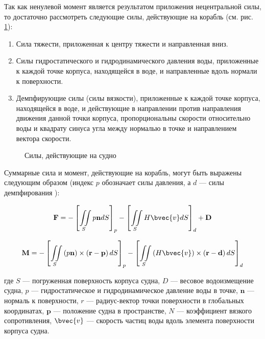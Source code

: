 Так как ненулевой момент является результатом приложения нецентральной силы, то достаточно рассмотреть следующие силы, действующие на корабль (см. рис. \ref{boat_forces}):
\begin{enumerate}
	\item	Сила тяжести, приложенная к центру тяжести и 
			направленная вниз.
	\item	Силы гидростатического и гидродинамического давления воды, приложенные к каждой точке корпуса, 
			находящейся в воде, и направленные вдоль нормали к поверхности.
	\item	Демпфирующие силы (силы вязкости), приложенные к каждой точке корпуса, 
			находящейся в воде, и действующие в направлении против 
			направления движения  данной точки корпуса, пропорциональны скорости 
			относительно воды и квадрату синуса угла между нормалью в точке и направлением 
			вектора скорости.
\end{enumerate}

\begin{figure}[ht]
\begin{center}
\end{center}
\caption{Силы, действующие на судно}
\label{boat_forces}
\end{figure}

Суммарные сила и момент, действующие на корабль, могут быть выражены следующим образом (индекс $p$ обозначает силы давления, а $d$ --- силы демпфирования ):

\begin{equation}
	\mathbf{F} = 
		-\left[ \iint\limits_{S} p \mathbf{n} dS 	\right]_{p}
		-\left[ \iint\limits_{S} H \bvec{v} dS 	\right]_{d}
		+ \mathbf{D}
	\label{F=integral}
\end{equation}

\begin{equation}
	\mathbf{M} = 
	-\left[ 
		\iint\limits_{S} 
		\left( p \mathbf{n} \right) \times 
		\left( \mathbf{r} - \mathbf{p} \right) dS	
	\right]_{p}
	-\left[ \iint\limits_{S} 
		\left( H \bvec{v} \right) \times 
		\left( \mathbf{r} - \mathbf{d} \right) dS	
	\right]_{d}
	\label{M=integral}
\end{equation}

где $S$ --- погруженная поверхность корпуса судна, $D$ --- весовое водоизмещение судна, $p$ --- гидростатическое и гидродинамическое давление воды в точке, $\mathbf{n}$ --- нормаль к поверхности, $r$ --- радиус-вектор точки поверхности в глобальных координатах, $\mathbf{p}$ --- положение судна в пространстве, $N$ --- коэффициент вязкого сопротивления, $\bvec{v}$ --- скорость частиц воды вдоль элемента поверхности корпуса судна.

